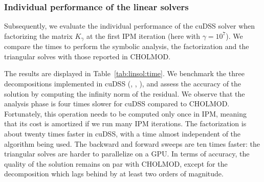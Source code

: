 \subsubsection{Individual performance of the linear solvers}
Subsequently, we evaluate the individual performance of the cuDSS solver when factorizing the matrix $K_{\gamma}$ at the first IPM iteration (here with $\gamma = 10^7$).
We compare the times to perform the symbolic analysis,
the factorization and the triangular solves with those reported in CHOLMOD.

The results are displayed in Table~\ref{tab:linsol:time}.
We benchmark the three decompositions implemented in cuDSS (\llt, \ldlt, \lu), and assess the accuracy of the solution by computing the infinity norm of the residual.
We observe that the analysis phase is four times slower for cuDSS compared to CHOLMOD.
Fortunately, this operation needs to be computed only once in IPM, meaning that its cost is amortized if we run many IPM iterations.
The factorization is about twenty times faster in cuDSS, with a time almost independent of the algorithm being used.
The backward and forward sweeps are ten times faster:
the triangular solves are harder to parallelize on a GPU.
In terms of accuracy, the quality of the solution remains on par with CHOLMOD, except for the \ldlt decomposition which lags behind by at least two orders of magnitude.


